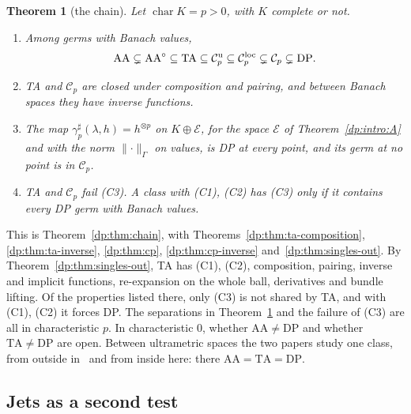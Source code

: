 \documentclass[11pt]{amsart}
\theoremstyle{definition}
\theoremstyle{remark}
\numberwithin{equation}{section}
\newcommand{\norm}[1]{\lVert #1\rVert}
\newcommand{\cC}{\mathcal{C}}
\theoremstyle{plain}
\newtheorem{introtheorem}{Theorem}
\theoremstyle{definition}
\theoremstyle{plain}
\begin{document}
\begin{introtheorem}[the chain]\label{dp:intro:C}
Let $\operatorname{char}K=p>0$, with $K$ complete or not.
\begin{enumerate}
\item Among germs with Banach values,
\[
 \mathrm{AA}\subsetneq\mathrm{AA}^\circ\subseteq\mathrm{TA}\subseteq\cC_p^{\rm u}\subseteq\cC_p^{\rm loc}\subsetneq\cC_p\subsetneq\mathrm{DP}.
\]
\item TA and $\cC_p$ are closed under composition and pairing, and between Banach spaces they have inverse functions.
\item The map $\gamma^\sharp_p(\lambda,h)=h^{\otimes p}$ on $K\oplus\mathcal E$, for the space $\mathcal E$ of Theorem~\ref{dp:intro:A} and with the norm $\norm\cdot_\Gamma$ on values, is DP at every point, and its germ at no point is in $\cC_p$.
\item TA and $\cC_p$ fail \textup{(C3)}. A class with \textup{(C1), (C2)} has \textup{(C3)} only if it contains every DP germ with Banach values.
\end{enumerate}
\end{introtheorem}

This is Theorem~\ref{dp:thm:chain}, with Theorems~\ref{dp:thm:ta-composition}, \ref{dp:thm:ta-inverse}, \ref{dp:thm:cp}, \ref{dp:thm:cp-inverse} and~\ref{dp:thm:singles-out}. By Theorem~\ref{dp:thm:singles-out}, TA has (C1), (C2), composition, pairing, inverse and implicit functions, re-expansion on the whole ball, derivatives and bundle lifting. Of the properties listed there, only (C3) is not shared by TA, and with (C1), (C2) it forces DP. The separations in Theorem~\ref{dp:intro:C} and the failure of (C3) are all in characteristic $p$. In characteristic $0$, whether $\mathrm{AA}\ne\mathrm{DP}$ and whether $\mathrm{TA}\ne\mathrm{DP}$ are open. Between ultrametric spaces the two papers study one class, from outside in~\cite{I} and from inside here: there $\mathrm{AA}=\mathrm{TA}=\mathrm{DP}$.

\subsection*{Jets as a second test}
\end{document}
